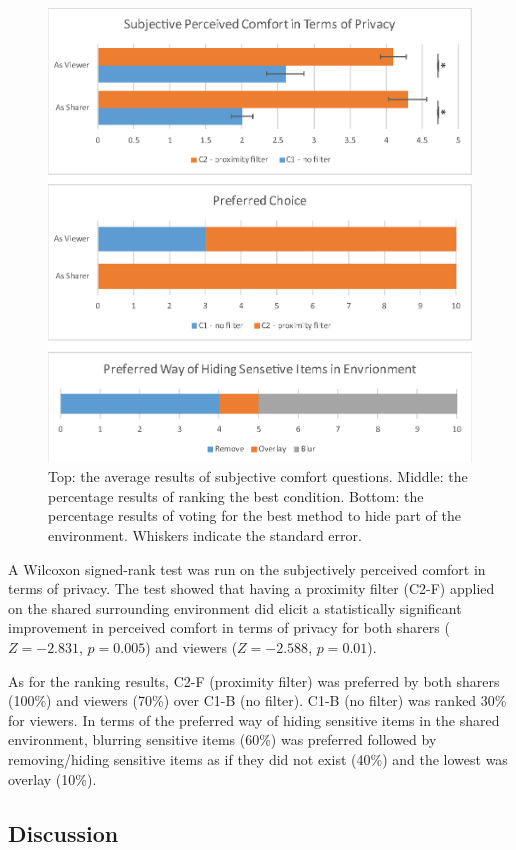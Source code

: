 \begin{figure}[ht]
  \centering
  \includegraphics[width=.8\linewidth]{images/53-environment-ismar18/images-04.eps}
  \caption{Top: the average results of subjective comfort questions. Middle: the percentage results of ranking the best condition. Bottom: the percentage results of voting for the best method to hide part of the environment. Whiskers indicate the standard error.}
  \label{fig:environment:results}
\end{figure}

A Wilcoxon signed-rank test was run on the subjectively perceived comfort in terms of privacy. The test showed that having a proximity filter (C2-F) applied on the shared surrounding environment did elicit a statistically significant improvement in perceived comfort in terms of privacy for both sharers ($Z=-2.831$, $p=0.005$) and viewers ($Z=-2.588$, $p=0.01$). 

As for the ranking results, C2-F (proximity filter) was preferred by both sharers (100\%) and viewers (70\%) over C1-B (no filter). C1-B (no filter) was ranked 30\% for viewers. In terms of the preferred way of hiding sensitive items in the shared environment, blurring sensitive items (60\%) was preferred followed by removing/hiding sensitive items as if they did not exist (40\%) and the lowest was overlay (10\%). 

\subsection{Discussion}

